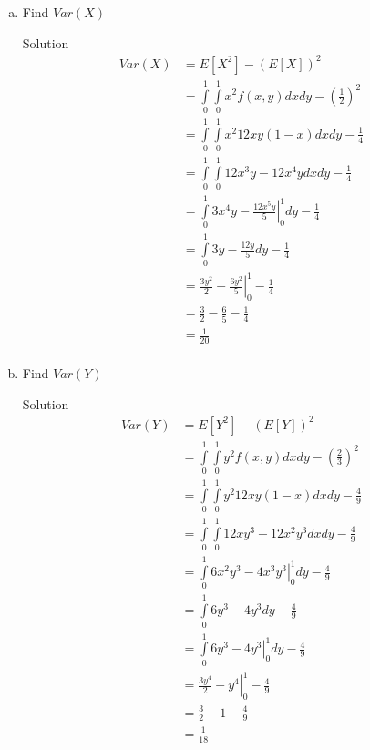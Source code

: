 \documentclass{article}
\begin{document}
\begin{spacing}{1.1}
\begin{homeworkProblem}
\begin{enumerate}[(a)]
\begin{homeworkSection}{Solution}
\begin{align*}
          &= 2 - \frac{ 4}{ 3}\\
          &= \frac{ 2}{ 3}\\
        \end{align*}
      \end{homeworkSection}
    \item Find $Var( X)$
      \begin{homeworkSection}{Solution}
        \begin{align*}
          Var( X) &= E[ X^2] - (E[ X])^2\\
          &= \int\limits_0^1 \int\limits_0^1 x^2 f( x, y) dx dy - (\frac{ 1}{ 2})^2\\
          &= \int\limits_0^1 \int\limits_0^1 x^2 12 x y (1 - x) dx dy - \frac{ 1}{ 4}\\
          &= \int\limits_0^1 \int\limits_0^1 12 x^3 y - 12 x^4 y dx dy - \frac{ 1}{ 4}\\
          &= \int\limits_0^1 \left. 3 x^4 y 
            - \frac{ 12 x^5 y}{ 5} \right|_0^1 dy - \frac{ 1}{ 4}\\
          &= \int\limits_0^1  3 y - \frac{ 12 y}{ 5} dy - \frac{ 1}{ 4}\\
          &= \left. \frac{ 3 y^2}{ 2} 
            - \frac{ 6 y^2}{ 5} \right|_0^1 - \frac{ 1}{ 4}\\
          &= \frac{ 3}{ 2} - \frac{ 6}{ 5} - \frac{ 1}{ 4}\\
          &= \frac{ 1}{ 20}\\
        \end{align*}
      \end{homeworkSection}
    \item Find $Var( Y)$
      \begin{homeworkSection}{Solution}
        \begin{align*}
          Var( Y) &= E[ Y^2] - (E[ Y])^2\\
          &= \int\limits_0^1 \int\limits_0^1 y^2 f( x, y) dx dy - (\frac{ 2}{ 3})^2\\
          &= \int\limits_0^1 \int\limits_0^1 y^2 12 x y (1 - x) dx dy - \frac{ 4}{ 9}\\
          &= \int\limits_0^1 \int\limits_0^1 12 x y^3 - 12 x^2 y^3 dx dy - \frac{ 4}{ 9}\\
          &= \int\limits_0^1 \left.6 x^2 y^3 - 4 x^3 y^3 \right|_0^1 dy - \frac{ 4}{ 9}\\
          &= \int\limits_0^1 6 y^3 - 4 y^3 dy - \frac{ 4}{ 9}\\
          &= \int\limits_0^1 \left.6 y^3 - 4 y^3 \right|_0^1 dy - \frac{ 4}{ 9}\\
          &= \left.\frac{ 3y^4}{ 2}  - y^4 \right|_0^1 - \frac{ 4}{ 9}\\
          &= \frac{ 3}{ 2} - 1 - \frac{ 4}{ 9}\\
          &= \frac{ 1}{ 18}\\
        \end{align*}
      \end{homeworkSection}
  \end{enumerate}
\end{homeworkProblem}


\end{spacing}
\end{document}
